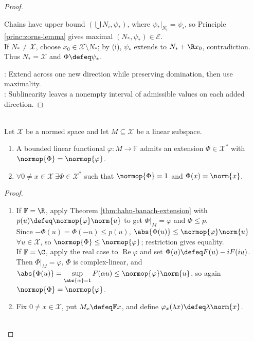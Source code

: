 \begin{theorem}
\begin{proof}
\begin{enumerate}[label=(\roman*)]
Chains have upper bound $(\bigcup N_i,\psi_*)$, where $\psi_*|_{N_i}=\psi_i$, so Principle \ref{princ:zorns-lemma} gives maximal $(N_*,\psi_*)\in\mathscr E$.\\
If $N_*\neq\mathcal X$, choose $x_0\in\mathcal X\setminus N_*$; by (i), $\psi_*$ extends to $N_*+\R x_0$, contradiction. Thus $N_*=\mathcal X$ and $\Phi\defeq\psi_*$.
\end{enumerate}
: Extend across one new direction while preserving domination, then use maximality.\\
: Sublinearity leaves a nonempty interval of admissible values on each added direction.
\end{proof}
\end{theorem}

\begin{corollary} \label{cor:hahn-banach-norm-preserving-extension-and-norming-functionals} \\
Let $\mathcal{X}$ be a normed space and let $M\subseteq\mathcal{X}$ be a linear subspace.
\begin{enumerate}[label=(\roman*)]
\setlength{\itemsep}{0pt}
\item A bounded linear functional $\varphi:M\to\mathbb{F}$ admits an extension $\Phi\in\mathcal{X}^*$ with $\normop{\Phi}=\normop{\varphi}$.
\item $\forall 0\neq x\in\mathcal{X}\ \exists\Phi\in\mathcal{X}^*$ such that $\normop{\Phi}=1$ and $\Phi(x)=\norm{x}$.
\end{enumerate}
\begin{proof}
\begin{enumerate}[label=(\roman*)]
\setlength{\itemsep}{0pt}
\item If $\mathbb F=\R$, apply Theorem \ref{thm:hahn-banach-extension} with $p(u)\defeq\normop{\varphi}\norm{u}$ to get $\Phi|_M=\varphi$ and $\Phi\leq p$.\\
Since $-\Phi(u)=\Phi(-u)\leq p(u)$, $\abs{\Phi(u)}\leq\normop{\varphi}\norm{u}$$\forall u\in\mathcal X$, so $\normop{\Phi}\leq\normop{\varphi}$; restriction gives equality.\\
If $\mathbb F=\C$, apply the real case to $\operatorname{Re}\varphi$ and set $\Phi(u)\defeq F(u)-iF(iu)$.\\
Then $\Phi|_M=\varphi$, $\Phi$ is complex-linear, and $\abs{\Phi(u)}=\sup\limits_{\abs{\alpha}=1}F(\alpha u)\leq\normop{\varphi}\norm{u}$, so again $\normop{\Phi}=\normop{\varphi}$.
\item Fix $0\neq x\in\mathcal X$, put $M_x\defeq\mathbb F x$, and define $\varphi_x(\lambda x)\defeq\lambda\norm{x}$.\\
$$
\end{enumerate}
\end{proof}
\end{corollary}
